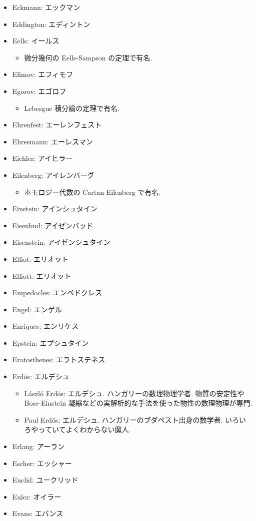 \documentclass[openany, a4paper, oneside]{jsbook}
\begin{document}
\begin{itemize}
\item Eckmann: エックマン
\item Eddington: エディントン
\item Eells: イールス
\begin{itemize}
\item 微分幾何の Eells-Sampson の定理で有名.
\end{itemize}
\item Efimov: エフィモフ
\item Egorov: エゴロフ
\begin{itemize}
\item Lebesgue 積分論の定理で有名.
\end{itemize}
\item Ehrenfest: エーレンフェスト
\item Ehresmann: エーレスマン
\item Eichler: アイヒラー
\item Eilenberg: アイレンバーグ
\begin{itemize}
\item ホモロジー代数の Cartan-Eilenberg で有名.
\end{itemize}
\item Einstein: アインシュタイン
\item Eisenbud: アイゼンバッド
\item Eisenstein: アイゼンシュタイン
\item Elliot: エリオット
\item Elliott: エリオット
\item Empedocles: エンペドクレス
\item Engel: エンゲル
\item Enriques: エンリケス
\item Epstein: エプシュタイン
\item Eratosthenes: エラトステネス
\item Erd\"os: エルデシュ
\begin{itemize}
\item L\'aszl\'o Erd\"os: エルデシュ. ハンガリーの数理物理学者. 物質の安定性や Bose-Einstein 凝縮などの実解析的な手法を使った物性の数理物理が専門.
\item Paul Erd\"os: エルデシュ. ハンガリーのブダペスト出身の数学者. いろいろやっていてよくわからない魔人.
\end{itemize}
\item Erlang: アーラン
\item Escher: エッシャー
\item Euclid: ユークリッド
\item Euler: オイラー
\item Evans: エバンス
\end{itemize}
\end{document}
